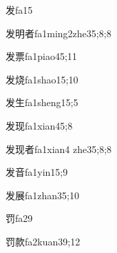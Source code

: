 
\begin{verbete}{发}{fa1}{5}
\end{verbete}

\begin{verbete}{发明者}{fa1ming2zhe3}{5;8;8}
\end{verbete}

\begin{verbete}{发票}{fa1piao4}{5;11}
\end{verbete}

\begin{verbete}{发烧}{fa1shao1}{5;10}
\end{verbete}

\begin{verbete}{发生}{fa1sheng1}{5;5}
\end{verbete}

\begin{verbete}{发现}{fa1xian4}{5;8}
\end{verbete}

\begin{verbete}{发现者}{fa1xian4 zhe3}{5;8;8}
\end{verbete}

\begin{verbete}{发音}{fa1yin1}{5;9}
\end{verbete}

\begin{verbete}{发展}{fa1zhan3}{5;10}
\end{verbete}

\begin{verbete}{罚}{fa2}{9}
\end{verbete}

\begin{verbete}{罚款}{fa2kuan3}{9;12}
\end{verbete}

